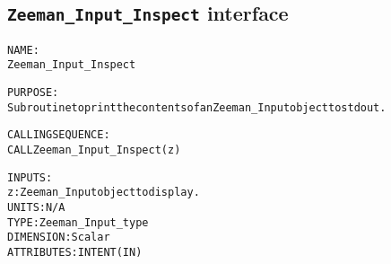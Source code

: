 \subsection{\texttt{Zeeman\_Input\_Inspect} interface}
  \label{sec:Zeeman_Input_Inspect_interface}
  \begin{alltt}
 
  NAME:
        Zeeman_Input_Inspect
 
  PURPOSE:
        Subroutine to print the contents of an Zeeman_Input object to stdout.
 
  CALLING SEQUENCE:
        CALL Zeeman_Input_Inspect( z )
 
  INPUTS:
        z:             Zeeman_Input object to display.
                       UNITS:      N/A
                       TYPE:       Zeeman_Input_type
                       DIMENSION:  Scalar
                       ATTRIBUTES: INTENT(IN)
 
  \end{alltt}
